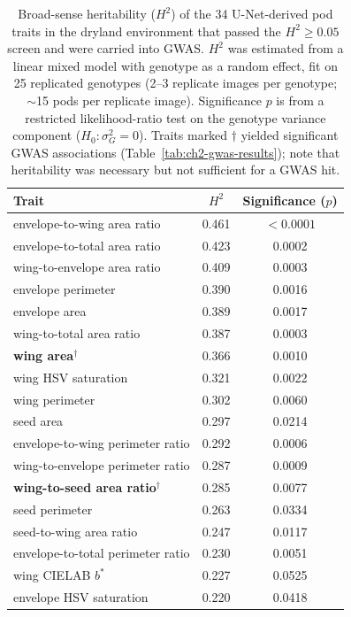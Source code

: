 \begin{table}[p]
 \centering
 \caption[Broad-sense heritability of the 34 U-Net derived pod traits]{Broad-sense heritability ($H^2$) of the 34 U-Net-derived pod traits in the dryland environment that passed the $H^2 \geq 0.05$ screen and were carried into GWAS. $H^2$ was estimated from a linear mixed model with genotype as a random effect, fit on 25 replicated genotypes (2--3 replicate images per genotype; $\sim$15 pods per replicate image). Significance $p$ is from a restricted likelihood-ratio test on the genotype variance component ($H_0\!:\sigma^2_G = 0$). Traits marked $\dagger$ yielded significant GWAS associations (Table~\ref{tab:ch2-gwas-results}); note that heritability was necessary but not sufficient for a GWAS hit.}\label{tab:ch2-heritability}
 \footnotesize
 \setlength{\tabcolsep}{6pt}
 \renewcommand{\arraystretch}{1.0}
 \begin{tabularx}{\textwidth}{@{}>{\raggedright\arraybackslash}X c c@{}}
 \toprule
 Trait & $H^2$ & Significance ($p$) \\
 \midrule
 envelope-to-wing area ratio & 0.461 & $<0.0001$ \\
 envelope-to-total area ratio & 0.423 & 0.0002 \\
 wing-to-envelope area ratio & 0.409 & 0.0003 \\
 envelope perimeter & 0.390 & 0.0016 \\
 envelope area & 0.389 & 0.0017 \\
 wing-to-total area ratio & 0.387 & 0.0003 \\
 \textbf{wing area}$^\dagger$ & 0.366 & 0.0010 \\
 wing HSV saturation & 0.321 & 0.0022 \\
 wing perimeter & 0.302 & 0.0060 \\
 seed area & 0.297 & 0.0214 \\
 envelope-to-wing perimeter ratio & 0.292 & 0.0006 \\
 wing-to-envelope perimeter ratio & 0.287 & 0.0009 \\
 \textbf{wing-to-seed area ratio}$^\dagger$ & 0.285 & 0.0077 \\
 seed perimeter & 0.263 & 0.0334 \\
 seed-to-wing area ratio & 0.247 & 0.0117 \\
 envelope-to-total perimeter ratio & 0.230 & 0.0051 \\
 wing CIELAB $b^*$ & 0.227 & 0.0525 \\
 envelope HSV saturation & 0.220 & 0.0418 \\

\end{tabularx}
\end{table}
